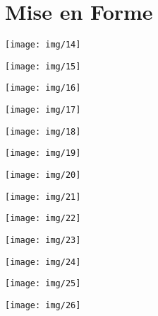 \documentclass[a4paper, 12pt, twoside,openright]{report}
\begin{document}
\part{Mise en Forme}
\begin{landscape} 		
	\texttt{[image: img/14]}
\end{landscape}
\begin{landscape} 		
	\texttt{[image: img/15]}
\end{landscape}
\begin{landscape} 		
	\texttt{[image: img/16]}
\end{landscape}
\begin{landscape} 		
	\texttt{[image: img/17]}
\end{landscape}
\begin{landscape} 		
	\texttt{[image: img/18]}
\end{landscape}
\begin{landscape} 		
	\texttt{[image: img/19]}
\end{landscape}
\begin{landscape} 		
	\texttt{[image: img/20]}
\end{landscape}
\begin{landscape} 		
	\texttt{[image: img/21]}
\end{landscape}
\begin{landscape} 		
	\texttt{[image: img/22]}
\end{landscape}
\begin{landscape} 		
	\texttt{[image: img/23]}
\end{landscape}
\begin{landscape} 		
	\texttt{[image: img/24]}
\end{landscape}
\begin{landscape} 		
	\texttt{[image: img/25]}
\end{landscape}
\begin{landscape} 		
	\texttt{[image: img/26]}
\end{landscape}
\end{document}
